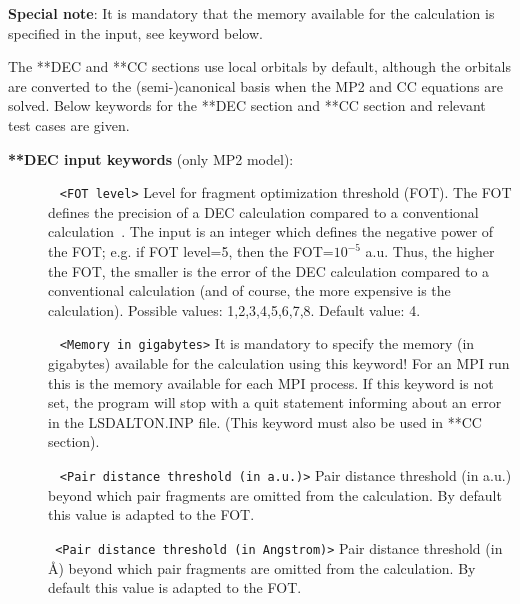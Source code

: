 \textbf{Special note}: It is mandatory that the memory available for the calculation is specified in the input, see  keyword below.

The **DEC and **CC sections use local orbitals by default, although the orbitals are converted to the (semi-)canonical basis when the MP2
and CC equations are solved.
Below keywords for the **DEC section and **CC section and relevant test cases are given. 

\vspace{1 cm}
\noindent
\textbf{**DEC input keywords} (only MP2 model):

\begin{description}
\item[]\verb| | \newline
\verb|<FOT level>|\newline
Level for fragment optimization threshold (FOT). The FOT defines the precision of a DEC calculation compared
to a conventional calculation~\cite{dec1,dec2,dec3,dec4,dec5,dec6}.
The input is an integer which defines the negative power of the FOT; e.g. if FOT level=5, then the FOT=$10^{-5}$ a.u.
Thus, the higher the FOT, the smaller is the error of the DEC calculation compared to a conventional calculation (and of course, the more expensive is the calculation). Possible values: 1,2,3,4,5,6,7,8. Default value: 4.


\item[] \verb| | \newline
\verb|<Memory in gigabytes>| \newline
It is mandatory to specify the memory (in gigabytes) available for the calculation using this keyword! For an MPI run this is the memory available for each MPI process.
If this keyword is not set, the program will stop with a quit statement informing about an error in the LSDALTON.INP file.
(This keyword must also be used in **CC section).


\item[] \verb| | \newline
\verb|<Pair distance threshold (in a.u.)>|\newline
Pair distance threshold (in a.u.) beyond which pair fragments are omitted from the calculation. By default this value is adapted to the FOT.

\item[]  \verb| | \newline
\verb|<Pair distance threshold (in Angstrom)>|\newline
Pair distance threshold (in {\AA}) beyond which pair fragments are omitted from the calculation. By default this value is adapted to the FOT.



\end{description}
